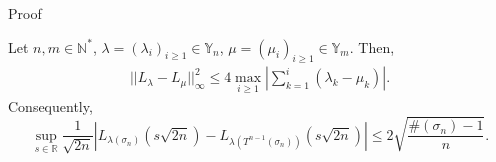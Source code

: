 \documentclass[english,xcolor=table]{beamer}
\begin{document}
\begin{frame}{Proof}

\begin{lemma} \label{34}
Let $n,m\in \mathbb{N}^*$, $\lambda=(\lambda_i)_{i\geq1}\in\mathbb{Y}_n$, $\mu=(\mu_i)_{i\geq1}\in\mathbb{Y}_m$. Then,
\begin{align*}\label{disVC}
||L_\lambda-L_\mu||_{\infty}^2 \leq 4 \max_{i\geq 1} \left|\sum_{k=1}^i( \lambda_k-\mu_k)\right|.
\end{align*}
Consequently, 
\begin{equation*}
\sup_{s\in \mathbb{R}} \frac{1}{\sqrt{2n}}\left|L_{\lambda(\sigma_n)}\left({s}{\sqrt{2n}}\right)- L_{\lambda(T^{n-1}(\sigma_n))}\left({s}{\sqrt{2n}}\right)\right| \leq 2 \sqrt{\frac{\#(\sigma_n)-1}{n}}.
\end{equation*}
\end{lemma}
\end{frame}
\end{document}
